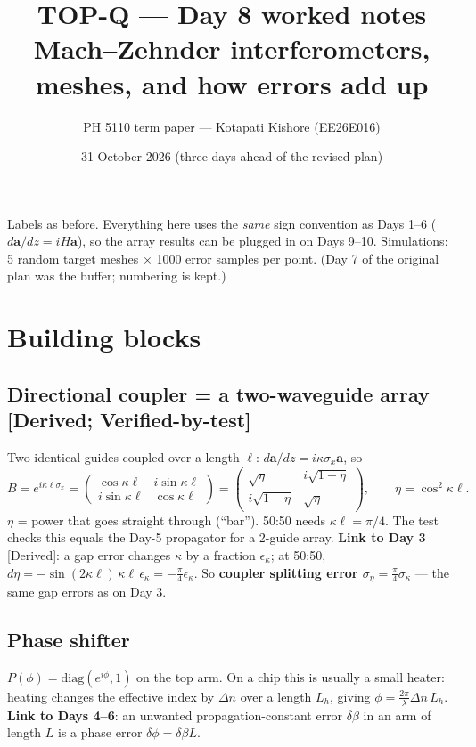 \documentclass[10pt,a4paper]{article}
\title{TOP-Q --- Day 8 worked notes\\[2pt]\large Mach--Zehnder interferometers, meshes, and how errors add up}
\author{PH 5110 term paper --- Kotapati Kishore (EE26E016)}
\date{31 October 2026 (three days ahead of the revised plan)}
\newcommand{\note}[1]{\par\smallskip\noindent\colorbox{gray!12}{\parbox{\dimexpr\linewidth-2\fboxsep}{\small #1}}\par\smallskip}
\newcommand{\evd}[1]{\textsf{\small[#1]}}
\begin{document}
\sloppy\maketitle

\note{Labels as before. Everything here uses the \emph{same} sign convention as Days 1--6 ($d\bm a/dz=iH\bm a$), so the array results can be plugged in on Days 9--10. Simulations: 5 random target meshes $\times$ 1000 error samples per point. (Day 7 of the original plan was the buffer; numbering is kept.)}

\tableofcontents

\section{Building blocks}
\subsection{Directional coupler = a two-waveguide array \evd{Derived; Verified-by-test}}
Two identical guides coupled over a length $\ell$: $d\bm a/dz=i\kappa\sigma_x\bm a$, so
\[
B=e^{i\kappa\ell\sigma_x}=\begin{pmatrix}\cos\kappa\ell & i\sin\kappa\ell\\ i\sin\kappa\ell & \cos\kappa\ell\end{pmatrix}
=\begin{pmatrix}\sqrt\eta & i\sqrt{1-\eta}\\ i\sqrt{1-\eta} & \sqrt\eta\end{pmatrix},\qquad \eta=\cos^2\kappa\ell .
\]
$\eta$ = power that goes straight through (``bar''). 50:50 needs $\kappa\ell=\pi/4$. The test checks this equals the Day-5 propagator for a 2-guide array.
\textbf{Link to Day 3} \evd{Derived}: a gap error changes $\kappa$ by a fraction $\epsilon_\kappa$; at 50:50, $d\eta=-\sin(2\kappa\ell)\,\kappa\ell\,\epsilon_\kappa=-\tfrac{\pi}{4}\epsilon_\kappa$. So \textbf{coupler splitting error $\sigma_\eta=\tfrac{\pi}{4}\sigma_\kappa$} --- the same gap errors as on Day 3.

\subsection{Phase shifter}
$P(\phi)=\mathrm{diag}(e^{i\phi},1)$ on the top arm. On a chip this is usually a small heater: heating changes the effective index by $\Delta n$ over a length $L_h$, giving $\phi=\frac{2\pi}{\lambda}\Delta n\,L_h$. \textbf{Link to Days 4--6}: an unwanted propagation-constant error $\delta\beta$ in an arm of length $L$ is a phase error $\delta\phi=\delta\beta L$.
\end{document}

